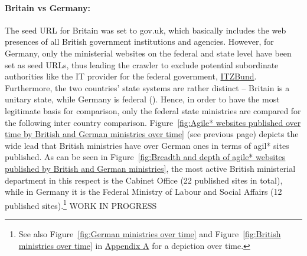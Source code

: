 \paragraph{Britain vs Germany:} 
\begin{wrapfigure}[10]{r}{0.5\textwidth}
	\centering
	 \texttt{[image: \{"Analysis/3\_Data\_Analysis/visualisations/british\_vs\_German\_federal\_ministries\_over\_time"]}.pdf}
	 \caption[Agile* sites published by British and German ministries over time]{Agile* sites published by British and German ministries over time}
	 \setlength{\belowcaptionskip}{-30pt}
	 \label{fig:Agile* websites published over time by British and German ministries over time}
\end{wrapfigure}
The seed URL for Britain was set to gov.uk, which basically includes the web presences of all British government institutions and agencies. However, for Germany, only the ministerial websites on the federal and state level have been set as seed URLs, thus leading the crawler to exclude potential subordinate authorities like the IT provider for the federal government, \href{https://www.itzbund.de/DE/Home/home_node.html}{ITZBund}. Furthermore, the two countries' state systems are rather distinct – Britain is a unitary state, while Germany is federal (\cite{Elazar1997}). Hence, in order to have the most legitimate basis for comparison, only the federal state ministries are compared for the following inter country comparison. Figure~\ref{fig:Agile* websites published over time by British and German ministries over time} (see previous page) depicts the wide lead that British ministries have over German ones in terms of agil* sites published. As can be seen in Figure~\ref{fig:Breadth and depth of agile* websites published by British and German ministries}, the most active British ministerial department in this respect is the Cabinet Office (22 published sites in total), while in Germany it is the Federal Ministry of Labour and Social Affairs (12 published sites).\footnote{See also Figure~\ref{fig:German ministries over time} and Figure~\ref{fig:British ministries over time} in \href{Appendix A}{Appendix A} for a depiction over time.} WORK IN PROGRESS

